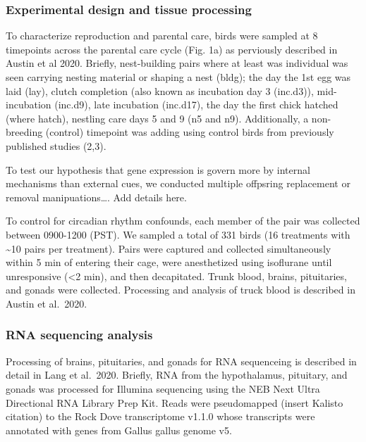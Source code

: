 \hypertarget{experimental-design-and-tissue-processing}{%
\subsubsection{Experimental design and tissue
processing}\label{experimental-design-and-tissue-processing}}

To characterize reproduction and parental care, birds were sampled at 8
timepoints across the parental care cycle (Fig. 1a) as perviously
described in Austin et al 2020. Briefly, nest-building pairs where at
least was individual was seen carrying nesting material or shaping a
nest (bldg); the day the 1st egg was laid (lay), clutch completion (also
known as incubation day 3 (inc.d3)), mid-incubation (inc.d9), late
incubation (inc.d17), the day the first chick hatched (where hatch),
nestling care days 5 and 9 (n5 and n9). Additionally, a non-breeding
(control) timepoint was adding using control birds from previously
published studies (2,3).

To test our hypothesis that gene expression is govern more by internal
mechanisms than external cues, we conducted multiple offpsring
replacement or removal manipuations\ldots{}. Add details here.

To control for circadian rhythm confounds, each member of the pair was
collected between 0900-1200 (PST). We sampled a total of 331 birds (16
treatments with \textasciitilde{}10 pairs per treatment). Pairs were
captured and collected simultaneously within 5 min of entering their
cage, were anesthetized using isoflurane until unresponsive
(\textless{}2 min), and then decapitated. Trunk blood, brains,
pituitaries, and gonads were collected. Processing and analysis of truck
blood is described in Austin et al.~2020.

\hypertarget{rna-sequencing-analysis}{%
\subsubsection{RNA sequencing analysis}\label{rna-sequencing-analysis}}

Processing of brains, pituitaries, and gonads for RNA sequenceing is
described in detail in Lang et al.~2020. Briefly, RNA from the
hypothalamus, pituitary, and gonads was processed for Illumina
sequencing using the NEB Next Ultra Directional RNA Library Prep Kit.
Reads were pseudomapped (insert Kalisto citation) to the Rock Dove
transcriptome v1.1.0 whose transcripts were annotated with genes from
Gallus gallus genome v5.

